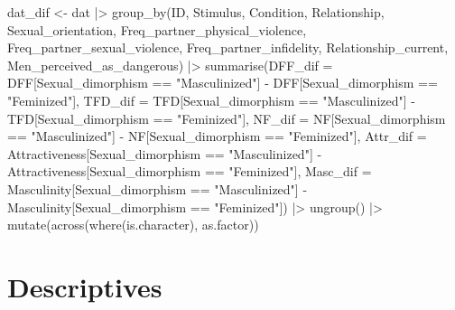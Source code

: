 \documentclass[
  bookmarksnumbered]{article}
\newenvironment{Shaded}{\begin{snugshade}}{\end{snugshade}}
\newcommand{\AttributeTok}[1]{\textcolor[rgb]{0.80,0.80,0.80}{#1}}
\newcommand{\FunctionTok}[1]{\textcolor[rgb]{0.94,0.94,0.56}{#1}}
\newcommand{\NormalTok}[1]{\textcolor[rgb]{0.80,0.80,0.80}{#1}}
\newcommand{\OtherTok}[1]{\textcolor[rgb]{0.94,0.94,0.56}{#1}}
\newcommand{\SpecialCharTok}[1]{\textcolor[rgb]{0.86,0.64,0.64}{#1}}
\newcommand{\StringTok}[1]{\textcolor[rgb]{0.80,0.58,0.58}{#1}}
\begin{document}
\begin{Shaded}
\begin{Highlighting}[]
\NormalTok{dat\_dif }\OtherTok{\textless{}{-}}\NormalTok{ dat }\SpecialCharTok{|\textgreater{}} 
  \FunctionTok{group\_by}\NormalTok{(ID, }
\NormalTok{           Stimulus, }
\NormalTok{           Condition, }
\NormalTok{           Relationship,}
\NormalTok{           Sexual\_orientation,}
\NormalTok{           Freq\_partner\_physical\_violence,}
\NormalTok{           Freq\_partner\_sexual\_violence,}
\NormalTok{           Freq\_partner\_infidelity,}
\NormalTok{           Relationship\_current,}
\NormalTok{           Men\_perceived\_as\_dangerous) }\SpecialCharTok{|\textgreater{}} 
  \FunctionTok{summarise}\NormalTok{(}\AttributeTok{DFF\_dif =}\NormalTok{ DFF[Sexual\_dimorphism }\SpecialCharTok{==} \StringTok{"Masculinized"}\NormalTok{] }\SpecialCharTok{{-}}\NormalTok{ DFF[Sexual\_dimorphism }\SpecialCharTok{==} \StringTok{"Feminized"}\NormalTok{],}
            \AttributeTok{TFD\_dif =}\NormalTok{ TFD[Sexual\_dimorphism }\SpecialCharTok{==} \StringTok{"Masculinized"}\NormalTok{] }\SpecialCharTok{{-}}\NormalTok{ TFD[Sexual\_dimorphism }\SpecialCharTok{==} \StringTok{"Feminized"}\NormalTok{],}
            \AttributeTok{NF\_dif =}\NormalTok{ NF[Sexual\_dimorphism }\SpecialCharTok{==} \StringTok{"Masculinized"}\NormalTok{] }\SpecialCharTok{{-}}\NormalTok{ NF[Sexual\_dimorphism }\SpecialCharTok{==} \StringTok{"Feminized"}\NormalTok{],}
            \AttributeTok{Attr\_dif =}\NormalTok{ Attractiveness[Sexual\_dimorphism }\SpecialCharTok{==} \StringTok{"Masculinized"}\NormalTok{] }\SpecialCharTok{{-}}\NormalTok{ Attractiveness[Sexual\_dimorphism }\SpecialCharTok{==} \StringTok{"Feminized"}\NormalTok{],}
            \AttributeTok{Masc\_dif =}\NormalTok{ Masculinity[Sexual\_dimorphism }\SpecialCharTok{==} \StringTok{"Masculinized"}\NormalTok{] }\SpecialCharTok{{-}}\NormalTok{ Masculinity[Sexual\_dimorphism }\SpecialCharTok{==} \StringTok{"Feminized"}\NormalTok{]) }\SpecialCharTok{|\textgreater{}} 
  \FunctionTok{ungroup}\NormalTok{() }\SpecialCharTok{|\textgreater{}} 
  \FunctionTok{mutate}\NormalTok{(}\FunctionTok{across}\NormalTok{(}\FunctionTok{where}\NormalTok{(is.character), as.factor))}
\end{Highlighting}
\end{Shaded}

\section{Descriptives}\label{descriptives}
\end{document}
